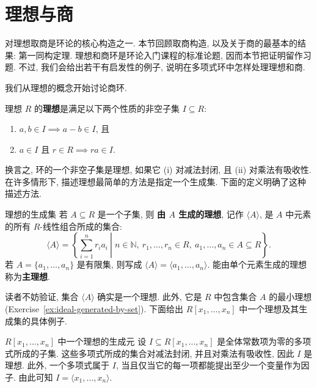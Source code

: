 \section{理想与商}\label{sec:ideals-quotients}

对理想取商是环论的核心构造之一. 本节回顾取商构造, 以及关于商的最基本的结果: 第一同构定理. 理想和商环是环论入门课程的标准论题, 因而本节把证明留作习题. 不过, 我们会给出若干有启发性的例子, 说明在多项式环中怎样处理理想和商.

我们从理想的概念开始讨论商环.

\begin{Definition}{理想}\label{def:ideal}
  $R$ 的\textbf{理想}是满足以下两个性质的非空子集 $I\subseteq R$:
  \begin{enumerate}[label=(\roman*)]
    \item $a,b\in I\implies a-b\in I$, 且
    \item $a\in I$ 且 $r\in R\implies ra\in I$.
  \end{enumerate}
\end{Definition}

换言之, 环的一个非空子集是理想, 如果它 (i) 对减法封闭, 且 (ii) 对乘法有吸收性. 在许多情形下, 描述理想最简单的方法是指定一个生成集. 下面的定义明确了这种描述方法.

\begin{Definition}{理想的生成集}\label{def:ideal-generating-set}
  若 $A\subseteq R$ 是一个子集, 则 \textbf{由 $A$ 生成的理想}, 记作 $\langle A\rangle$, 是 $A$ 中元素的所有 $R$-线性组合所成的集合:
  \[
    \langle A\rangle=
    \left\{\left.\sum_{i=1}^{n}r_{i}a_{i}\ \right|\;
    n\in\mathbb{N},\ r_{1},\ldots,r_{n}\in R,\ a_{1},\ldots,a_{n}\in A\subseteq R\right\}.
  \]
  若 $A=\{a_{1},\ldots,a_{n}\}$ 是有限集, 则写成 $\langle A\rangle=\langle a_{1},\ldots,a_{n}\rangle$. 能由单个元素生成的理想称为\textbf{主理想}.
\end{Definition}

读者不妨验证, 集合 $\langle A\rangle$ 确实是一个理想. 此外, 它是 $R$ 中包含集合 $A$ 的最小理想 (Exercise~\ref{ex:ideal-generated-by-set}). 下面给出 $R[x_{1},\ldots,x_{n}]$ 中一个理想及其生成集的具体例子.

\begin{Example}{{\textmd{$R[x_{1},\ldots,x_{n}]$} 中一个理想的生成元}}\label{ex:vanishing-constant-ideal}
  设 $I\subseteq R[x_{1},\ldots,x_{n}]$ 是全体常数项为零的多项式所成的子集. 这些多项式所成的集合对减法封闭, 并且对乘法有吸收性, 因此 $I$ 是理想. 此外, 一个多项式属于 $I$, 当且仅当它的每一项都能提出至少一个变量作为因子. 由此可知 $I=\langle x_{1},\ldots,x_{n}\rangle$.
\end{Example}


